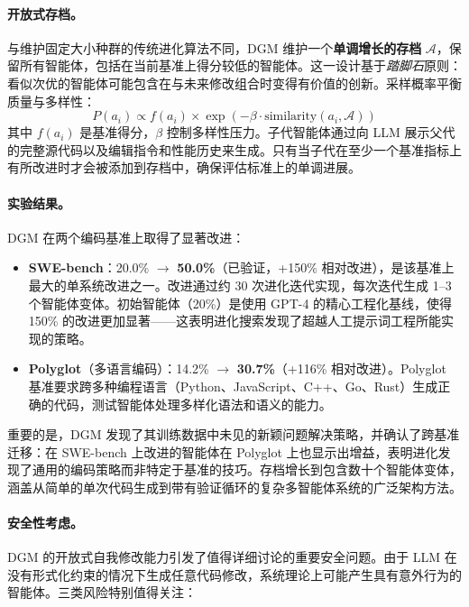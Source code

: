 \paragraph{开放式存档。}
与维护固定大小种群的传统进化算法不同，DGM 维护一个\textbf{单调增长的存档} $\mathcal{A}$，保留所有智能体，包括在当前基准上得分较低的智能体。这一设计基于\emph{踏脚石}原则：看似次优的智能体可能包含在与未来修改组合时变得有价值的创新。采样概率平衡质量与多样性：
\begin{equation}
P(a_i) \propto f(a_i) \times \exp\left(-\beta \cdot \text{similarity}(a_i, \mathcal{A})\right)
\end{equation}
其中 $f(a_i)$ 是基准得分，$\beta$ 控制多样性压力。子代智能体通过向 LLM 展示父代的完整源代码以及编辑指令和性能历史来生成。只有当子代在至少一个基准指标上有所改进时才会被添加到存档中，确保评估标准上的单调进展。

\paragraph{实验结果。}
DGM 在两个编码基准上取得了显著改进：
\begin{itemize}
    \item \textbf{SWE-bench}：20.0\% $\rightarrow$ \textbf{50.0\%}（已验证，+150\% 相对改进），是该基准上最大的单系统改进之一。改进通过约 30 次进化迭代实现，每次迭代生成 1--3 个智能体变体。初始智能体（20\%）是使用 GPT-4 的精心工程化基线，使得 150\% 的改进更加显著——这表明进化搜索发现了超越人工提示词工程所能实现的策略。
    \item \textbf{Polyglot}（多语言编码）：14.2\% $\rightarrow$ \textbf{30.7\%}（+116\% 相对改进）。Polyglot 基准要求跨多种编程语言（Python、JavaScript、C++、Go、Rust）生成正确的代码，测试智能体处理多样化语法和语义的能力。
\end{itemize}
重要的是，DGM 发现了其训练数据中未见的新颖问题解决策略，并确认了跨基准迁移：在 SWE-bench 上改进的智能体在 Polyglot 上也显示出增益，表明进化发现了通用的编码策略而非特定于基准的技巧。存档增长到包含数十个智能体变体，涵盖从简单的单次代码生成到带有验证循环的复杂多智能体系统的广泛架构方法。

\paragraph{安全性考虑。}
DGM 的开放式自我修改能力引发了值得详细讨论的重要安全问题。由于 LLM 在没有形式化约束的情况下生成任意代码修改，系统理论上可能产生具有意外行为的智能体。三类风险特别值得关注：

